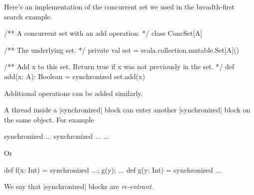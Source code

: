 
\begin{slide}

Here's an implementation of the concurrent set we used in the
breadth-first search example. 
\begin{scala}
/** A concurrent set with an add operation. */
class ConcSet[A]{
  /** The underlying set. */
  private val set = scala.collection.mutable.Set[A]()

  /** Add x to this set.  Return true if x was not previously in the set. */
  def add(x: A): Boolean = synchronized{ set.add(x) }
}
\end{scala}

Additional operations can be added similarly. 
\end{slide}


\begin{slide}

A thread inside a |synchronized| block can enter another |synchronized| block
on the same object.  For example
%
\begin{scala}
  synchronized{
    ...
    synchronized{ ... }
    ...
  }
\end{scala}
%
Or
%
\begin{scala}
def f(x: Int) = synchronized{ ...; g(y); ... }
def g(y: Int) = synchronized{ ... }
\end{scala}

We say that |synchronized| blocks are \emph{re-entrant}. 
\end{slide}
